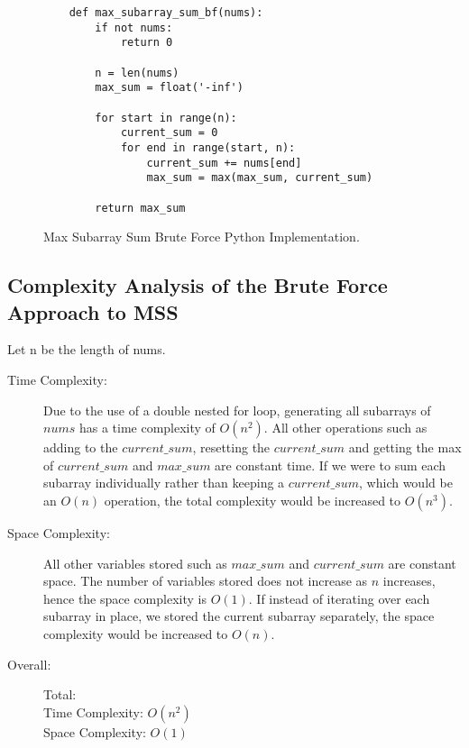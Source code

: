 \begin{figure}[H]
    \centering
    \begin{lstlisting}
    def max_subarray_sum_bf(nums):
        if not nums:
            return 0
    
        n = len(nums)
        max_sum = float('-inf')
    
        for start in range(n):
            current_sum = 0
            for end in range(start, n):
                current_sum += nums[end]
                max_sum = max(max_sum, current_sum)
    
        return max_sum
    \end{lstlisting}
    \caption{Max Subarray Sum Brute Force Python Implementation.}
    \label{fig:max-subarray-sum-bf}
\end{figure}



\subsection{Complexity Analysis of the Brute Force Approach to MSS}\label{subsec:ca-max-subarray-sum-bf}
Let n be the length of nums.
\begin{description}
    \item[Time Complexity:]
        Due to the use of a double nested for loop,
        generating all subarrays of $nums$ has a time complexity of $O(n^2)$.
        All other operations such as adding to the $current\_sum$, resetting the $current\_sum$ and getting the max of $current\_sum$ and $max\_sum$ are constant time.
        If we were to sum each subarray individually rather than keeping a $current\_sum$, which would be an $O(n)$ operation, the total complexity would be increased to $O(n^3)$.

    \item[Space Complexity:] 
        All other variables stored such as $max\_sum$ and $current\_sum$ are constant space.
        The number of variables stored does not increase as $n$ increases, hence the space complexity is $O(1)$.
        If instead of iterating over each subarray in place, we stored the current subarray separately, the space complexity would be increased to $O(n)$.

    \item[Overall:] Total:\\
        Time Complexity: $O(n^2)$\\
        Space Complexity: $O(1)$
    
\end{description}

